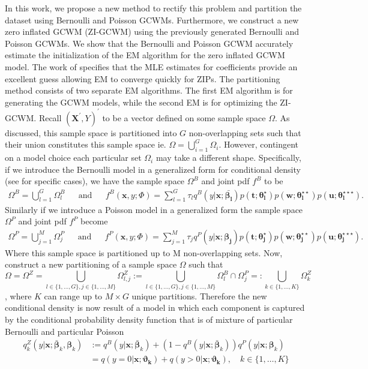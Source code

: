 \documentclass[11pt,letterpaper]{article}
\numberwithin{equation}{section}
\numberwithin{equation}{section}
\numberwithin{equation}{section}
\begin{document}
	In this work, we propose a new method to rectify this problem and partition the dataset using Bernoulli and Poisson GCWMs. Furthermore, we construct a new zero inflated GCWM (ZI-GCWM) using the previously generated Bernoulli and Poisson GCWMs. We show that the Bernoulli and Poisson GCWM accurately estimate the initialization of the EM algorithm for the zero inflated GCWM model. The work of \cite{Lambert} specifies that the MLE estimates for coefficients provide an excellent guess allowing EM to converge quickly for ZIPs. The partitioning method consists of two separate EM algorithms. The first EM algorithm is for generating the GCWM models, while the second EM is for optimizing the ZI-GCWM. Recall $(\bm {X^{'}}, Y)^{'}$ to be a vector defined on some sample space $\Omega$. As discussed, this sample space is partitioned into $G$ non-overlapping sets such that their union constitutes this sample space ie. $ \Omega = \bigcup_{i=1}^G \Omega_i $.  However, contingent on a model choice each particular set $\Omega_i$ may take a different shape.
	 Specifically, if we introduce the Bernoulli model in a generalized form for conditional density (see \cite{Ingrassia+Punzo+Vittadini+Minotti:2015} for specific cases), we have the sample space $\Omega^B$ and joint pdf $f^B$ to be \begin{align*}
\Omega^B =  \bigcup_{l =1}^G \Omega_l^B & & \text{and} &  &
f^B(\bm x, y; \Phi)= \sum_{l=1}^{G} \tau_l q^B(y|\bm{x}; \bm{\bar{\beta_l}}) p(\bm{t};\bm{\theta_l^{\star}})p(\bm{w};\bm{\theta_l^{\star\star}})p(\bm{u};\bm{\theta_l^{\star\star\star}}).
\end{align*}
Similarly if we introduce a Poisson model in a generalized form the sample space $\Omega^P$ and joint pdf $f^P$ become
\begin{align*}
\Omega^P =  \bigcup_{j =1}^M \Omega_j^P & & \text{and} &  &
f^P(\bm x, y; \Phi)= \sum_{j=1}^{M} \tau_j q^P(y|\bm{x};\bm{\beta_{j}}) p(\bm{t};\bm{\theta_j^{\star}})p(\bm{w};\bm{\theta_j^{\star\star}})p(\bm{u};\bm{\theta_j^{\star\star\star}}).
\end{align*}
Where this sample space is partitioned up to M non-overlapping sets.
 Now, construct a new partitioning of a sample space $\Omega$ such that
$$\Omega =  \Omega^Z = \bigcup_{l \in \{1 ,\ldots, G \} , j \in \{1 ,\ldots, M \}  } \Omega_{l,j}^Z := \bigcup_{l \in \{1 ,\ldots, G \} , j \in \{1 ,\ldots, M \}  }  \Omega_l^B \cap \Omega_j^P =: \bigcup_{k \in \{1 ,\ldots, K \}} \Omega_k^Z $$, where $K$ can range up to $M \times G$ unique partitions. Therefore the new conditional density  is now result of a model in which each component is captured by the conditional probability density function that is of mixture of particular Bernoulli and particular Poisson
\begin{align}
q^Z_{k}(y|\bm{x};  \bm{\bar{\beta}}_k,\bm{ \beta}_k) & := q^B(y|\bm{x}; \bm{\bar{\beta}}_k) +(1-  q^B(y|\bm{x}; \bm{\bar{\beta}}_k) ) q^P(y|\bm{x};\bm{\beta}_k) \nonumber \\
& = q(y = 0|\bm{x};\bm{\vartheta_{k} }) +  q(y > 0|\bm{x} ; \bm{\vartheta_{k}}), \quad k \in \{1 ,\ldots, K \}
\label{ziGCWM}
\end{align}
\end{document}
